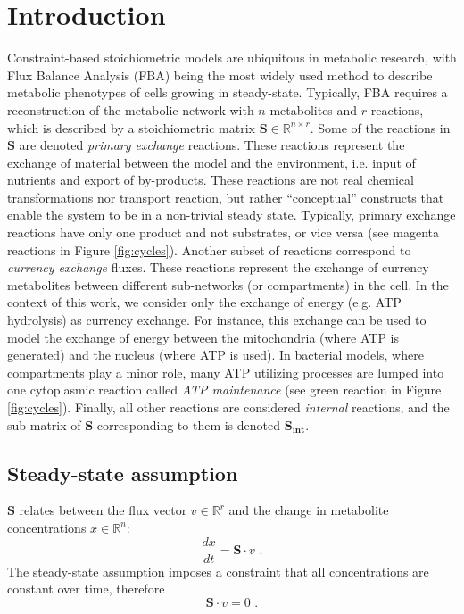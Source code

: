 \documentclass[twocolumn]{bmcart}%
\newcommand{\Sint}{\mathbf{S_{int}}}
\begin{document}
\section*{Introduction}
Constraint-based stoichiometric models are ubiquitous in metabolic research, with Flux Balance Analysis (FBA) being the most widely used method to describe metabolic phenotypes of cells growing in steady-state. Typically, FBA requires a reconstruction of the metabolic network with $n$ metabolites and $r$ reactions, which is described by a stoichiometric matrix $\mathbf{S} \in \mathbb{R}^{n \times r}$. Some of the reactions in $\mathbf{S}$ are denoted \emph{primary exchange} reactions. These reactions represent the exchange of material between the model and the environment, i.e. input of nutrients and export of by-products. These reactions are not real chemical transformations nor transport reaction, but rather ``conceptual'' constructs that enable the system to be in a non-trivial steady state. Typically, primary exchange reactions have only one product and not substrates, or vice versa (see magenta reactions in Figure \ref{fig:cycles}). Another subset of reactions correspond to \emph{currency exchange} fluxes. These reactions represent the exchange of currency metabolites between different sub-networks (or compartments) in the cell. In the context of this work, we consider only the exchange of energy (e.g. ATP hydrolysis) as currency exchange. For instance, this exchange can be used to model the exchange of energy between the mitochondria (where ATP is generated) and the nucleus (where ATP is used). In bacterial models, where compartments play a minor role, many ATP utilizing processes are lumped into one cytoplasmic reaction called \emph{ATP maintenance} (see green reaction in Figure \ref{fig:cycles}). Finally, all other reactions are considered \emph{internal} reactions, and the sub-matrix of $\mathbf{S}$ corresponding to them is denoted $\Sint$.

\subsection*{Steady-state assumption}
$\mathbf{S}$ relates between the flux vector $v \in \mathbb{R}^{r}$ and the change in metabolite concentrations $x \in \mathbb{R}^{n}$:
\begin{equation}
\frac{dx}{dt} = \mathbf{S} \cdot v\,\,.
\end{equation}
The steady-state assumption imposes a constraint that all concentrations are constant over time, therefore
\begin{equation}
\mathbf{S} \cdot v = 0 \,\,. 
\end{equation}
\end{document}

